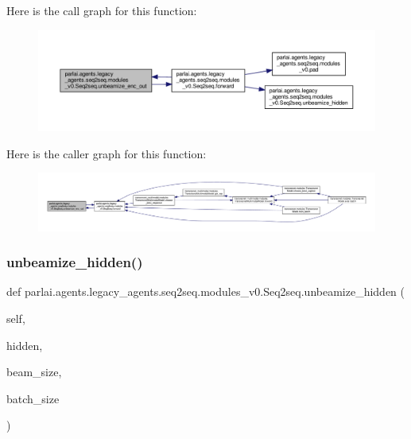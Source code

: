 Here is the call graph for this function\+:
\nopagebreak
\begin{figure}[H]
\begin{center}
\leavevmode
\includegraphics[width=350pt]{classparlai_1_1agents_1_1legacy__agents_1_1seq2seq_1_1modules__v0_1_1Seq2seq_a0c0270e1e4c3f72bca49d3752d90baab_cgraph}
\end{center}
\end{figure}
Here is the caller graph for this function\+:
\nopagebreak
\begin{figure}[H]
\begin{center}
\leavevmode
\includegraphics[width=350pt]{classparlai_1_1agents_1_1legacy__agents_1_1seq2seq_1_1modules__v0_1_1Seq2seq_a0c0270e1e4c3f72bca49d3752d90baab_icgraph}
\end{center}
\end{figure}
\mbox{\label{classparlai_1_1agents_1_1legacy__agents_1_1seq2seq_1_1modules__v0_1_1Seq2seq_adab65a09af78ad2a9bcdca010f0d0fe6}} 
\subsubsection{\texorpdfstring{unbeamize\+\_\+hidden()}{unbeamize\_hidden()}}
{\footnotesize\ttfamily def parlai.\+agents.\+legacy\+\_\+agents.\+seq2seq.\+modules\+\_\+v0.\+Seq2seq.\+unbeamize\+\_\+hidden (\begin{DoxyParamCaption}\item[{}]{self,  }\item[{}]{hidden,  }\item[{}]{beam\+\_\+size,  }\item[{}]{batch\+\_\+size }\end{DoxyParamCaption})}

